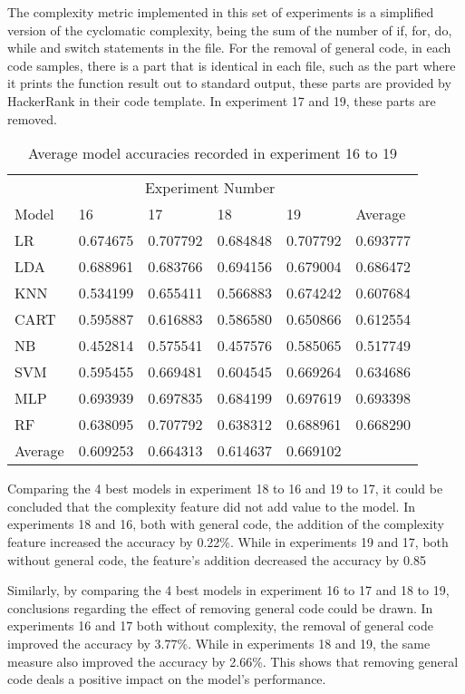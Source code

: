 \documentclass{report}
\begin{document}
The complexity metric implemented in this set of experiments is a simplified version of the cyclomatic complexity, being the sum of the number of if, for, do, while and switch statements in the file. For the removal of general code, in each code samples, there is a part that is identical in each file, such as the part where it prints the function result out to standard output, these parts are provided by HackerRank in their code template. In experiment 17 and 19, these parts are removed.

\begin{table}[h!]
\centering
\begin{tabular}{l|llll|l}
\hline
& \multicolumn{4}{c|}{Experiment Number} & \\
Model & 16 & 17 & 18 & 19 & Average \\
\hline
LR & 0.674675 & 0.707792 & 0.684848 & 0.707792 & 0.693777 \\
LDA & 0.688961 & 0.683766 & 0.694156 & 0.679004 & 0.686472 \\
KNN & 0.534199 & 0.655411 & 0.566883 & 0.674242 & 0.607684 \\
CART & 0.595887 & 0.616883 & 0.586580 & 0.650866 & 0.612554 \\
NB & 0.452814 & 0.575541 & 0.457576 & 0.585065 & 0.517749 \\
SVM & 0.595455 & 0.669481 & 0.604545 & 0.669264 & 0.634686 \\
MLP & 0.693939 & 0.697835 & 0.684199 & 0.697619 & 0.693398 \\
RF & 0.638095 & 0.707792 & 0.638312 & 0.688961 & 0.668290 \\
\hline
Average & 0.609253 & 0.664313 & 0.614637 & 0.669102 & \\
\hline
\end{tabular}
\caption{Average model accuracies recorded in experiment 16 to 19}
\label{tab:3.4}
\end{table}

Comparing the 4 best models in experiment 18 to 16 and 19 to 17, it could be concluded that the complexity feature did not add value to the model. In experiments 18 and 16, both with general code, the addition of the complexity feature increased the accuracy by 0.22\%. While in experiments 19 and 17, both without general code, the feature’s addition decreased the accuracy by 0.85%

Similarly, by comparing the 4 best models in experiment 16 to 17 and 18 to 19, conclusions regarding the effect of removing general code could be drawn. In experiments 16 and 17 both without complexity, the removal of general code improved the accuracy by 3.77\%. While in experiments 18 and 19, the same measure also improved the accuracy by 2.66\%. This shows that removing general code deals a positive impact on the model’s performance.
\end{document}
